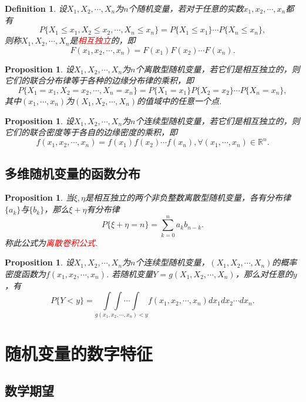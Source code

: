 \documentclass{article}
\newtheorem{proposition}[theorem]{Proposition}
\newtheorem{definition}[theorem]{Definition}
\newcommand{\redt}[1]{\textcolor{red}{#1}}
\begin{document}
\begin{definition}
\rm 设$X_1,X_2,\cdots,X_n$为$n$个随机变量，若对于任意的实数$x_1,x_2,\cdots,x_n$都有
$$
P\{X_1 \leq x_1, X_2 \leq x_2 ,\cdots, X_n \leq x_n\} = P\{X_1 \leq x_1\} \cdots P\{X_n \leq x_n\},
$$
则称$X_1,X_2,\cdots,X_n$是\redt{相互独立}的，即
$$
F(x_1,x_2,\cdots,x_n) = F(x_1)F(x_2)\cdots F(x_n). 
$$
\end{definition}

\begin{proposition}
\rm 设$X_1,X_2,\cdots,X_n$为$n$个离散型随机变量，若它们是相互独立的，则它们的联合分布律等于各种的边缘分布律的乘积，即
$$
P\{X_1 = x_1, X_2 = x_2 , \cdots, X_n = x_n\} = P\{X_1 = x_1\}P\{X_2 = x_2\}\cdots P\{X_n = x_n\},
$$
其中$(x_1,\cdots,x_n)$为$(X_1,X_2,\cdots,X_n)$的值域中的任意一个点. 
\end{proposition}

\begin{proposition}
\rm 设$X_1,X_2,\cdots,X_n$为$n$个连续型随机变量，若它们是相互独立的，则它们的联合密度等于各自的边缘密度的乘积，即
$$
f(x_1,x_2,\cdots,x_n) = f(x_1)f(x_2)\cdots f(x_n), \forall (x_1,\cdots,x_n) \in \mathbb{R}^n.
$$
\end{proposition}

\subsection{多维随机变量的函数分布}

\begin{proposition}
\rm 当$\xi,\eta$是相互独立的两个非负整数离散型随机变量，各有分布律$\{a_k\}$与$\{b_k\}$，那么$\xi+\eta$有分布律
$$
P\{\xi+\eta = n\} = \sum\limits_{k=0}^n a_kb_{n-k}. 
$$
称此公式为\redt{离散卷积公式}.
\end{proposition}

\begin{proposition}
\rm 设$X_1,X_2,\cdots,X_n$为$n$个连续型随机变量，$(X_1,X_2,\cdots,X_n)$的概率密度函数为$f(x_1,x_2,\cdots,x_n)$. 若随机变量$Y=g(X_1,X_2,\cdots,X_n)$，那么对任意的$y$，有
$$
P\{Y < y\} = \underset{g(x_1,x_2,\cdots,x_n) < y}{\int\int\cdots\int}f(x_1,x_2,\cdots,x_n)dx_1dx_2\cdots dx_n.
$$
\end{proposition}


\section{随机变量的数字特征}

\subsection{数学期望}
\end{document}
